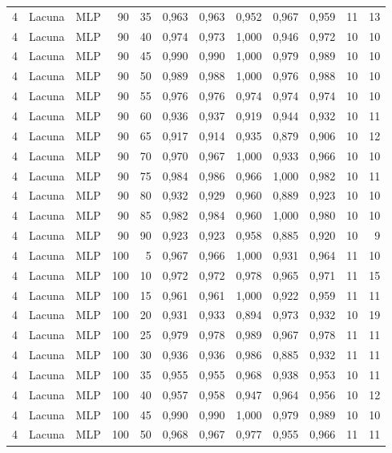 \begin{longtable}{@{}rllrrrrrrrrr@{}}
4 & Lacuna & MLP & 90 & 35 & 0,963 & 0,963 & 0,952 & 0,967 & 0,959 & 11 & 13 \\
4 & Lacuna & MLP & 90 & 40 & 0,974 & 0,973 & 1,000 & 0,946 & 0,972 & 10 & 10 \\
4 & Lacuna & MLP & 90 & 45 & 0,990 & 0,990 & 1,000 & 0,979 & 0,989 & 10 & 10 \\
4 & Lacuna & MLP & 90 & 50 & 0,989 & 0,988 & 1,000 & 0,976 & 0,988 & 10 & 10 \\
4 & Lacuna & MLP & 90 & 55 & 0,976 & 0,976 & 0,974 & 0,974 & 0,974 & 10 & 10 \\
4 & Lacuna & MLP & 90 & 60 & 0,936 & 0,937 & 0,919 & 0,944 & 0,932 & 10 & 11 \\
4 & Lacuna & MLP & 90 & 65 & 0,917 & 0,914 & 0,935 & 0,879 & 0,906 & 10 & 12 \\
4 & Lacuna & MLP & 90 & 70 & 0,970 & 0,967 & 1,000 & 0,933 & 0,966 & 10 & 10 \\
4 & Lacuna & MLP & 90 & 75 & 0,984 & 0,986 & 0,966 & 1,000 & 0,982 & 10 & 11 \\
4 & Lacuna & MLP & 90 & 80 & 0,932 & 0,929 & 0,960 & 0,889 & 0,923 & 10 & 10 \\
4 & Lacuna & MLP & 90 & 85 & 0,982 & 0,984 & 0,960 & 1,000 & 0,980 & 10 & 10 \\
4 & Lacuna & MLP & 90 & 90 & 0,923 & 0,923 & 0,958 & 0,885 & 0,920 & 10 & 9 \\
4 & Lacuna & MLP & 100 & 5 & 0,967 & 0,966 & 1,000 & 0,931 & 0,964 & 11 & 10 \\
4 & Lacuna & MLP & 100 & 10 & 0,972 & 0,972 & 0,978 & 0,965 & 0,971 & 11 & 15 \\
4 & Lacuna & MLP & 100 & 15 & 0,961 & 0,961 & 1,000 & 0,922 & 0,959 & 11 & 11 \\
4 & Lacuna & MLP & 100 & 20 & 0,931 & 0,933 & 0,894 & 0,973 & 0,932 & 10 & 19 \\
4 & Lacuna & MLP & 100 & 25 & 0,979 & 0,978 & 0,989 & 0,967 & 0,978 & 11 & 11 \\
4 & Lacuna & MLP & 100 & 30 & 0,936 & 0,936 & 0,986 & 0,885 & 0,932 & 11 & 11 \\
4 & Lacuna & MLP & 100 & 35 & 0,955 & 0,955 & 0,968 & 0,938 & 0,953 & 10 & 11 \\
4 & Lacuna & MLP & 100 & 40 & 0,957 & 0,958 & 0,947 & 0,964 & 0,956 & 10 & 12 \\
4 & Lacuna & MLP & 100 & 45 & 0,990 & 0,990 & 1,000 & 0,979 & 0,989 & 10 & 10 \\
4 & Lacuna & MLP & 100 & 50 & 0,968 & 0,967 & 0,977 & 0,955 & 0,966 & 11 & 11 \\

\end{longtable}
